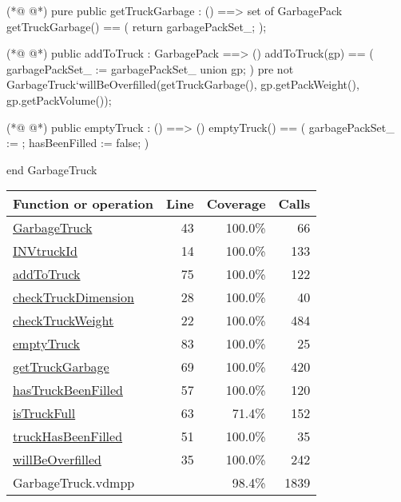 \begin{vdmpp}[breaklines=true]
(*@
\label{getTruckGarbage:69}
@*)
pure public getTruckGarbage : () ==> set of GarbagePack
getTruckGarbage() ==
(
    return garbagePackSet_;
);

(*@
\label{addToTruck:75}
@*)
public addToTruck : GarbagePack ==> ()
addToTruck(gp) ==
(
    garbagePackSet_ := garbagePackSet_ union {gp};
)
pre not GarbageTruck`willBeOverfilled(getTruckGarbage(), gp.getPackWeight(), gp.getPackVolume());


(*@
\label{emptyTruck:83}
@*)
public emptyTruck : () ==> ()
emptyTruck() == 
(
    garbagePackSet_ := {};
    hasBeenFilled := false;
)

end GarbageTruck
\end{vdmpp}
\bigskip
\begin{longtable}{|l|r|r|r|}
\hline
Function or operation & Line & Coverage & Calls \\
\hline
\hline
\hyperref[GarbageTruck:43]{GarbageTruck} & 43&100.0\% & 66 \\
\hline
\hyperref[INVtruckId:14]{INVtruckId} & 14&100.0\% & 133 \\
\hline
\hyperref[addToTruck:75]{addToTruck} & 75&100.0\% & 122 \\
\hline
\hyperref[checkTruckDimension:28]{checkTruckDimension} & 28&100.0\% & 40 \\
\hline
\hyperref[checkTruckWeight:22]{checkTruckWeight} & 22&100.0\% & 484 \\
\hline
\hyperref[emptyTruck:83]{emptyTruck} & 83&100.0\% & 25 \\
\hline
\hyperref[getTruckGarbage:69]{getTruckGarbage} & 69&100.0\% & 420 \\
\hline
\hyperref[hasTruckBeenFilled:57]{hasTruckBeenFilled} & 57&100.0\% & 120 \\
\hline
\hyperref[isTruckFull:63]{isTruckFull} & 63&71.4\% & 152 \\
\hline
\hyperref[truckHasBeenFilled:51]{truckHasBeenFilled} & 51&100.0\% & 35 \\
\hline
\hyperref[willBeOverfilled:35]{willBeOverfilled} & 35&100.0\% & 242 \\
\hline
\hline
GarbageTruck.vdmpp & & 98.4\% & 1839 \\
\hline
\end{longtable}

